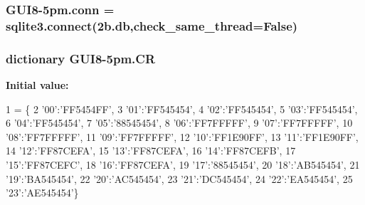 \subsubsection[{\texorpdfstring{conn}{conn}}]{\setlength{\rightskip}{0pt plus 5cm}G\+U\+I8-\/5pm.\+conn = sqlite3.\+connect(\textquotesingle{}2b.\+db\textquotesingle{},check\+\_\+same\+\_\+thread=\+False)}\hypertarget{namespaceGUI8-5pm_a754cc5d2663b1ceb611c13b8e4ec91ad}{}\label{namespaceGUI8-5pm_a754cc5d2663b1ceb611c13b8e4ec91ad}
\subsubsection[{\texorpdfstring{CR}{CR}}]{\setlength{\rightskip}{0pt plus 5cm}dictionary G\+U\+I8-\/5pm.\+CR}\hypertarget{namespaceGUI8-5pm_a14d7ab1cf4721110f93f3f0b29286697}{}\label{namespaceGUI8-5pm_a14d7ab1cf4721110f93f3f0b29286697}
{\bfseries Initial value\+:}
\begin{DoxyCode}
1 = \{
2 \textcolor{stringliteral}{'00'}:\textcolor{stringliteral}{'FF5454FF'},
3 \textcolor{stringliteral}{'01'}:\textcolor{stringliteral}{'FF545454'},
4 \textcolor{stringliteral}{'02'}:\textcolor{stringliteral}{'FF545454'},
5 \textcolor{stringliteral}{'03'}:\textcolor{stringliteral}{'FF545454'},
6 \textcolor{stringliteral}{'04'}:\textcolor{stringliteral}{'FF545454'},
7 \textcolor{stringliteral}{'05'}:\textcolor{stringliteral}{'88545454'},
8 \textcolor{stringliteral}{'06'}:\textcolor{stringliteral}{'FF7FFFFF'},
9 \textcolor{stringliteral}{'07'}:\textcolor{stringliteral}{'FF7FFFFF'},
10 \textcolor{stringliteral}{'08'}:\textcolor{stringliteral}{'FF7FFFFF'},
11 \textcolor{stringliteral}{'09'}:\textcolor{stringliteral}{'FF7FFFFF'},
12 \textcolor{stringliteral}{'10'}:\textcolor{stringliteral}{'FF1E90FF'},
13 \textcolor{stringliteral}{'11'}:\textcolor{stringliteral}{'FF1E90FF'},
14 \textcolor{stringliteral}{'12'}:\textcolor{stringliteral}{'FF87CEFA'},
15 \textcolor{stringliteral}{'13'}:\textcolor{stringliteral}{'FF87CEFA'},
16 \textcolor{stringliteral}{'14'}:\textcolor{stringliteral}{'FF87CEFB'},
17 \textcolor{stringliteral}{'15'}:\textcolor{stringliteral}{'FF87CEFC'},
18 \textcolor{stringliteral}{'16'}:\textcolor{stringliteral}{'FF87CEFA'},
19 \textcolor{stringliteral}{'17'}:\textcolor{stringliteral}{'88545454'},
20 \textcolor{stringliteral}{'18'}:\textcolor{stringliteral}{'AB545454'},
21 \textcolor{stringliteral}{'19'}:\textcolor{stringliteral}{'BA545454'},
22 \textcolor{stringliteral}{'20'}:\textcolor{stringliteral}{'AC545454'},
23 \textcolor{stringliteral}{'21'}:\textcolor{stringliteral}{'DC545454'},
24 \textcolor{stringliteral}{'22'}:\textcolor{stringliteral}{'EA545454'},
25 \textcolor{stringliteral}{'23'}:\textcolor{stringliteral}{'AE545454'}\}
\end{DoxyCode}
